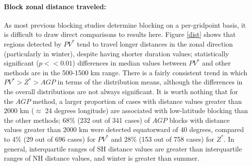 \documentclass[smallextended]{svjour3}       %
\numberwithin{equation}{section}
\begin{document}
 
\paragraph{Block zonal distance traveled:} As most previous blocking studies determine blocking on a per-gridpoint basis, it is difficult to draw direct comparisons to results here. {\color{blue} Figure \ref{dist} shows that regions detected by $PV^*$ tend to travel longer distances in the zonal direction (particularly in winter), despite having shorter duration values; statistically significant ($p<<0.01$) differences in median values between $PV^*$ and other methods are in the 500-1500 km range. There is a fairly consistent trend in which $PV^*>Z^*>AGP$ in terms of the distribution means, although the differences in the overall distributions are not always significant. It is worth nothing that for the $AGP$ method, a larger proportion of cases with distance values greater than 2000 km ($\approx$ 24 degrees longitude) are associated with low-latitude blocking than the other methods; 68\% (232 out of 341 cases) of $AGP$ blocks with distance values greater than 2000 km were detected equatorward of 40 degrees, compared to 4\% (29 out of 696 cases) for $PV^*$ and 28\% (153 out of 758 cases) for $Z^*$. In general, interquartile ranges of SH distance values are greater than interquartile ranges of NH distance values, and winter is greater than summer.}



\end{document}
